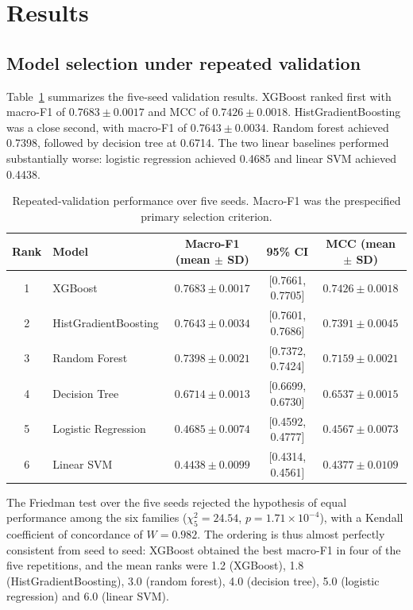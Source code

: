 \documentclass[12pt,a4paper]{article}
\begin{document}
\section{Results}

\subsection{Model selection under repeated validation}
\label{sec:selection}

Table~\ref{tab:validation} summarizes the five-seed validation results. XGBoost
ranked first with macro-F1 of $0.7683\pm0.0017$ and MCC of
$0.7426\pm0.0018$. HistGradientBoosting was a close second, with macro-F1 of
$0.7643\pm0.0034$. Random forest achieved 0.7398, followed by decision tree at
0.6714. The two linear baselines performed substantially worse: logistic
regression achieved 0.4685 and linear SVM achieved 0.4438.

\begin{table}[t]
\centering
\caption{Repeated-validation performance over five seeds. Macro-F1 was the
prespecified primary selection criterion.}
\label{tab:validation}
\small
\begin{tabular}{clccc}
\toprule
Rank & Model & Macro-F1 (mean $\pm$ SD) & 95\% CI & MCC (mean $\pm$ SD)\\
\midrule
1 & XGBoost & $0.7683\pm0.0017$ & [0.7661, 0.7705] & $0.7426\pm0.0018$\\
2 & HistGradientBoosting & $0.7643\pm0.0034$ & [0.7601, 0.7686] & $0.7391\pm0.0045$\\
3 & Random Forest & $0.7398\pm0.0021$ & [0.7372, 0.7424] & $0.7159\pm0.0021$\\
4 & Decision Tree & $0.6714\pm0.0013$ & [0.6699, 0.6730] & $0.6537\pm0.0015$\\
5 & Logistic Regression & $0.4685\pm0.0074$ & [0.4592, 0.4777] & $0.4567\pm0.0073$\\
6 & Linear SVM & $0.4438\pm0.0099$ & [0.4314, 0.4561] & $0.4377\pm0.0109$\\
\bottomrule
\end{tabular}
\end{table}

The Friedman test over the five seeds rejected the hypothesis of equal
performance among the six families ($\chi^2_{5}=24.54$, $p=1.71\times10^{-4}$),
with a Kendall coefficient of concordance of $W=0.982$. The ordering is thus
almost perfectly consistent from seed to seed: XGBoost obtained the best
macro-F1 in four of the five repetitions, and the mean ranks were 1.2
(XGBoost), 1.8 (HistGradientBoosting), 3.0 (random forest), 4.0 (decision
tree), 5.0 (logistic regression) and 6.0 (linear SVM).
\end{document}
